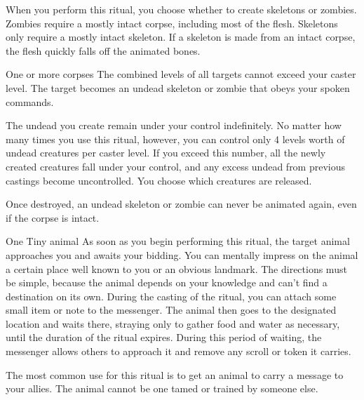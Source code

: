 \spellspecial When you perform this ritual, you choose whether to create skeletons or zombies. Zombies require a mostly intact corpse, including most of the flesh. Skeletons only require a mostly intact skeleton. If a skeleton is made from an intact corpse, the flesh quickly falls off the animated bones.
\begin{spelltarget}{One or more corpses}
    \spellspecial The combined levels of all targets cannot exceed your caster level.
    \spelleffect The target becomes an undead skeleton or zombie that obeys your spoken commands.
\end{spelltarget}
\spellnotes The undead you create remain under your control indefinitely. No matter how many times you use this ritual, however, you can control only 4 levels worth of undead creatures per caster level. If you exceed this number, all the newly created creatures fall under your control, and any excess undead from previous castings become uncontrolled. You choose which creatures are released.

Once destroyed, an undead skeleton or zombie can never be animated again, even if the corpse is intact.

\spellrng{\rnglong}
\begin{spelltarget}{One Tiny animal}
    \spelleffect As soon as you begin performing this ritual, the target animal approaches you and awaits your bidding. You can mentally impress on the animal a certain place well known to you or an obvious landmark. The directions must be simple, because the animal depends on your knowledge and can't find a destination on its own. During the casting of the ritual, you can attach some small item or note to the messenger. The animal then goes to the designated location and waits there, straying only to gather food and water as necessary, until the duration of the ritual expires. During this period of waiting, the messenger allows others to approach it and remove any scroll or token it carries.
\end{spelltarget}
\spellnotes The most common use for this ritual is to get an animal to carry a message to your allies. The animal cannot be one tamed or trained by someone else.

